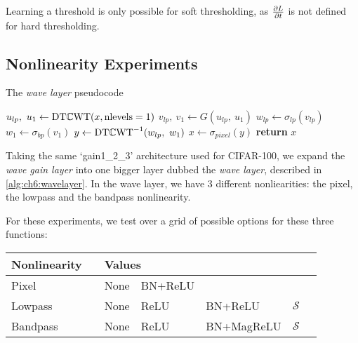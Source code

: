 Learning a threshold is only possible for soft thresholding, as $\frac{\partial L}{\partial t}$ is
not defined for hard thresholding. 

\subsection{Nonlinearity Experiments}
\begin{algorithm}[t]
  \caption{The \emph{wave layer} pseudocode}\label{alg:ch6:wavelayer}
\begin{algorithmic}[1]
  \State $u_{lp},\ u_{1} \gets \mathrm{DT}\mathbb{C}\mathrm{WT}(x, \mbox{nlevels}=1) $ 
  \State $v_{lp},\ v_{1} \gets G(u_{lp},\ u_{1}) $ 
  \State $w_{lp} \gets \sigma_{lp}(v_{lp})$ 
  \State $w_{1} \gets \sigma_{bp}(v_{1})$ 
  \State $y \gets \mathrm{DT}\mathbb{C}\mathrm{WT}^{-1}(w_{lp},\ w_{1})$
  \State $x \gets \sigma_{pixel}(y)$ 
  \State \textbf{return} $x$
\EndProcedure
\end{algorithmic}
\end{algorithm}
Taking the same `gain1\_2\_3' architecture used for CIFAR-100, we expand the
\emph{wave gain layer} into one bigger layer
dubbed the \emph{wave layer}, described in \autoref{alg:ch6:wavelayer}. In the wave
layer, we have 3 different nonliearities: the pixel, the lowpass 
and the bandpass nonlinearity.

For these experiments, we test over a grid of possible options for these three
functions:
\begin{table}[h!]
  \centering
\begin{tabular}{l l l l l l l}
  \toprule
  Nonlinearity & \hphantom{abc} & \multicolumn{4}{l}{Values} \\
  \midrule
  Pixel && None & BN+ReLU \\
  Lowpass && None & ReLU & BN+ReLU & $\mathcal{S}$ \\
  Bandpass && None & ReLU & BN+MagReLU & $\mathcal{S}$ 
  \\\bottomrule
\end{tabular}
\end{table}

